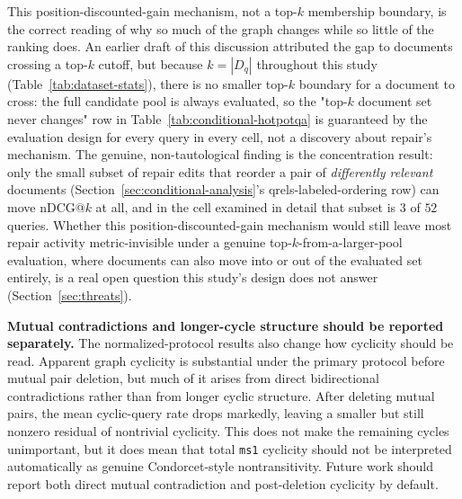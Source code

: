 \documentclass[manuscript,anonymous,review]{acmart}
\begin{document}
This position-discounted-gain mechanism, not a top-$k$ membership boundary,
is the correct reading of why so much of the graph changes while so little
of the ranking does. An earlier draft of this discussion attributed the
gap to documents crossing a top-$k$ cutoff, but because $k=|D_q|$ throughout
this study (Table~\ref{tab:dataset-stats}), there is no smaller top-$k$
boundary for a document to cross: the full candidate pool is always
evaluated, so the "top-$k$ document set never changes" row in
Table~\ref{tab:conditional-hotpotqa} is guaranteed by the evaluation design
for every query in every cell, not a discovery about repair's mechanism.
The genuine, non-tautological finding is the concentration result: only
the small subset of repair edits that reorder a pair of \emph{differently
relevant} documents (Section~\ref{sec:conditional-analysis}'s
qrels-labeled-ordering row) can move nDCG@$k$ at all, and in the cell
examined in detail that subset is $3$ of $52$ queries. Whether this
position-discounted-gain mechanism would still leave most repair activity
metric-invisible under a genuine top-$k$-from-a-larger-pool evaluation,
where documents can also move into or out of the evaluated set entirely, is
a real open question this study's design does not answer (Section~\ref{sec:threats}).

\textbf{Mutual contradictions and longer-cycle structure should be reported
separately.} The normalized-protocol results also change how cyclicity should be read.
Apparent graph cyclicity is substantial under the primary protocol before mutual
pair deletion, but much of it arises from direct bidirectional contradictions
rather than from longer cyclic structure. After deleting mutual pairs, the mean
cyclic-query rate drops markedly, leaving a smaller but still nonzero residual
of nontrivial cyclicity. This does not make the remaining cycles unimportant,
but it does mean that total \texttt{ms1} cyclicity should not be interpreted
automatically as genuine Condorcet-style nontransitivity. Future work should
report both direct mutual contradiction and post-deletion cyclicity by default.
\end{document}
